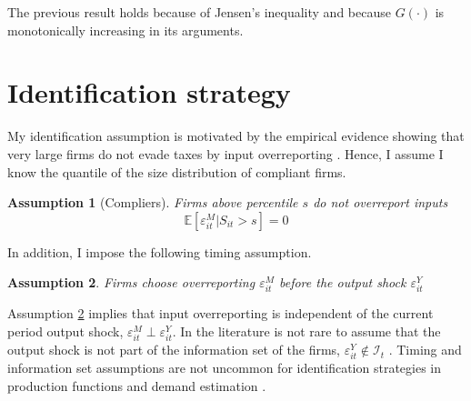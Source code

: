 \documentclass[
  12pt]{article}
\newtheorem{ass}{Assumption}
\theoremstyle{definition}
\theoremstyle{remark}
\begin{document}
The previous result holds because of Jensen's inequality and because
\(G(\cdot)\) is monotonically increasing in its arguments.

\hypertarget{identification-strategy}{%
\section{Identification strategy}\label{identification-strategy}}

My identification assumption is motivated by the empirical evidence
showing that very large firms do not evade taxes by input overreporting
\citep{Carrillo2022}. Hence, I assume I know the quantile of the size
distribution of compliant firms.

\begin{tcolorbox}[enhanced jigsaw, rightrule=.15mm, colframe=quarto-callout-color-frame, opacityback=0, colback=white, breakable, arc=.35mm, left=2mm, bottomrule=.15mm, toprule=.15mm, leftrule=.75mm]

\begin{ass}[Compliers]\label{ass-comp}
Firms above percentile $s$ do not overreport inputs $$\mathbb{E}[\varepsilon^M_{it}|S_{it}>s]=0$$
\end{ass}

\end{tcolorbox}

In addition, I impose the following timing assumption.

\begin{tcolorbox}[enhanced jigsaw, rightrule=.15mm, colframe=quarto-callout-color-frame, opacityback=0, colback=white, breakable, arc=.35mm, left=2mm, bottomrule=.15mm, toprule=.15mm, leftrule=.75mm]

\begin{ass}\label{ass-ind}
Firms choose overreporting $\varepsilon^M_{it}$ \emph{before} the output shock $\varepsilon^Y_{it}$
\end{ass}

\end{tcolorbox}

Assumption \ref{ass-ind} implies that input overreporting is independent
of the current period output shock,
\(\varepsilon^M_{it} \perp \varepsilon^Y_{it}\). In the literature is
not rare to assume that the output shock is not part of the information
set of the firms, \(\varepsilon^Y_{it}\not\in \mathcal{I}_t\)
\citep{Gandhi2020}. Timing and information set assumptions are not
uncommon for identification strategies in production functions and
demand estimation \citep{Ackerberg2021, Ackerberg2019}.
\end{document}
